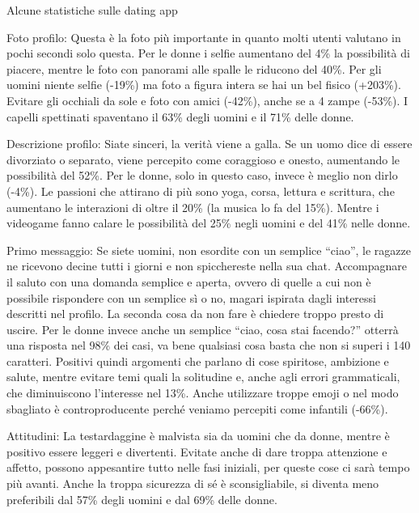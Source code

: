 \documentclass[12pt]{book} %
\begin{document}
\begin{mdframed}[linewidth=1pt]
Alcune statistiche sulle dating app

Foto profilo: Questa è la foto più importante in quanto molti utenti valutano in pochi secondi solo questa. Per le donne
i selfie aumentano del 4\% la possibilità di piacere, mentre le foto con panorami alle spalle le riducono del 40\%. Per
gli uomini niente selfie (-19\%) ma foto a figura intera se hai un bel fisico (+203\%). Evitare gli occhiali da sole e
foto con amici (-42\%), anche se a 4 zampe (-53\%). I capelli spettinati spaventano il 63\% degli uomini e il 71\%
delle donne. 

Descrizione profilo: Siate sinceri, la verità viene a galla. Se un uomo dice di essere divorziato o separato, viene
percepito come coraggioso e onesto, aumentando le possibilità del 52\%. Per le donne, solo in questo caso, invece è
meglio non dirlo (-4\%). Le passioni che attirano di più sono yoga, corsa, lettura e scrittura, che aumentano le
interazioni di oltre il 20\% (la musica lo fa del 15\%). Mentre i videogame fanno calare le possibilità del 25\% negli
uomini e del 41\% nelle donne.

Primo messaggio: Se siete uomini, non esordite con un semplice “ciao”, le ragazze ne ricevono decine tutti i giorni e
non spicchereste nella sua chat. Accompagnare il saluto con una domanda semplice e aperta, ovvero di quelle a cui non è
possibile rispondere con un semplice sì o no, magari ispirata dagli interessi descritti nel profilo. La seconda cosa da
non fare è chiedere troppo presto di uscire. Per le donne invece anche un semplice “ciao, cosa stai facendo?” otterrà
una risposta nel 98\% dei casi, va bene qualsiasi cosa basta che non si superi i 140 caratteri. Positivi quindi
argomenti che parlano di cose spiritose, ambizione e salute, mentre evitare temi quali la solitudine e, anche agli
errori grammaticali, che diminuiscono l'interesse nel 13\%. Anche utilizzare troppe emoji o nel modo sbagliato è
controproducente perché veniamo percepiti come infantili (-66\%).

Attitudini: La testardaggine è malvista sia da uomini che da donne, mentre è positivo essere leggeri e divertenti.
Evitate anche di dare troppa attenzione e affetto, possono appesantire tutto nelle fasi iniziali, per queste cose ci
sarà tempo più avanti. Anche la troppa sicurezza di sé è sconsigliabile, si diventa meno preferibili dal 57\% degli
uomini e dal 69\% delle donne.



\end{mdframed}
\end{document}
